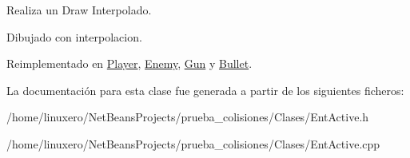 Realiza un Draw Interpolado. 

Dibujado con interpolacion. 

Reimplementado en \hyperlink{classPlayer_a6fa2109456d203d45b0460fa53ff247b}{Player}, \hyperlink{classEnemy_a9a34d38fac00edea2f45a9084bdfe1f6}{Enemy}, \hyperlink{classGun_a70271085b85f4cfa2cf8e74975e7fef9}{Gun} y \hyperlink{classBullet_af27d3a1699386dcd15bcb4a338b8b993}{Bullet}.



La documentación para esta clase fue generada a partir de los siguientes ficheros\-:\begin{DoxyCompactItemize}
\item 
/home/linuxero/\-Net\-Beans\-Projects/prueba\-\_\-colisiones/\-Clases/Ent\-Active.\-h\item 
/home/linuxero/\-Net\-Beans\-Projects/prueba\-\_\-colisiones/\-Clases/Ent\-Active.\-cpp\end{DoxyCompactItemize}
